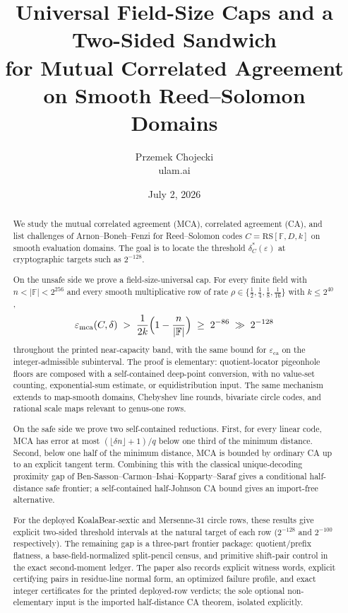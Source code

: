 \documentclass[11pt]{article}
\title{Universal Field-Size Caps and a Two-Sided Sandwich\\ for Mutual Correlated Agreement on Smooth Reed--Solomon Domains}
\author{Przemek Chojecki\\ \small ulam.ai}
\date{July 2, 2026}
\theoremstyle{definition}
\theoremstyle{remark}
\newcommand{\F}{\mathbb{F}}
\newcommand{\RS}{\mathrm{RS}}
\newcommand{\eca}{\varepsilon_{\mathrm{ca}}}
\newcommand{\emca}{\varepsilon_{\mathrm{mca}}}
\begin{document}
\maketitle

\begin{abstract}
We study the mutual correlated agreement (MCA), correlated agreement (CA), and list challenges of Arnon--Boneh--Fenzi \cite{ABF26} for Reed--Solomon codes $C=\RS[\F,D,k]$ on smooth evaluation domains.  The goal is to locate the threshold $\delta_C^*(\varepsilon)$ at cryptographic targets such as $2^{-128}$.

On the unsafe side we prove a field-size-universal cap.  For every finite field with $n<|\F|<2^{256}$ and every smooth multiplicative row of rate $\rho\in\{\frac12,\frac14,\frac18,\frac1{16}\}$ with $k\le2^{40}$,
\[
\emca(C,\delta)\;>\;\frac1{2k}\Bigl(1-\frac n{|\F|}\Bigr)\;\ge\;2^{-86}\;\gg\;2^{-128}
\]
throughout the printed near-capacity band, with the same bound for $\eca$ on the integer-admissible subinterval.  The proof is elementary: quotient-locator pigeonhole floors are composed with a self-contained deep-point conversion, with no value-set counting, exponential-sum estimate, or equidistribution input.  The same mechanism extends to map-smooth domains, Chebyshev line rounds, bivariate circle codes, and rational scale maps relevant to genus-one rows.

On the safe side we prove two self-contained reductions.  First, for every linear code, MCA has error at most $(\lfloor\delta n\rfloor+1)/q$ below one third of the minimum distance.  Second, below one half of the minimum distance, MCA is bounded by ordinary CA up to an explicit tangent term.  Combining this with the classical unique-decoding proximity gap of Ben-Sasson--Carmon--Ishai--Kopparty--Saraf \cite{BCIKS20} gives a conditional half-distance safe frontier; a self-contained half-Johnson CA bound gives an import-free alternative.

For the deployed KoalaBear-sextic and Mersenne-$31$ circle rows, these results give explicit two-sided threshold intervals at the natural target of each row ($2^{-128}$ and $2^{-100}$ respectively).  The remaining gap is a three-part frontier package: quotient/prefix flatness, a base-field-normalized split-pencil census, and primitive shift-pair control in the exact second-moment ledger.  The paper also records explicit witness words, explicit certifying pairs in residue-line normal form, an optimized failure profile, and exact integer certificates for the printed deployed-row verdicts; the sole optional non-elementary input is the imported half-distance CA theorem, isolated explicitly.
\end{abstract}
\end{document}
